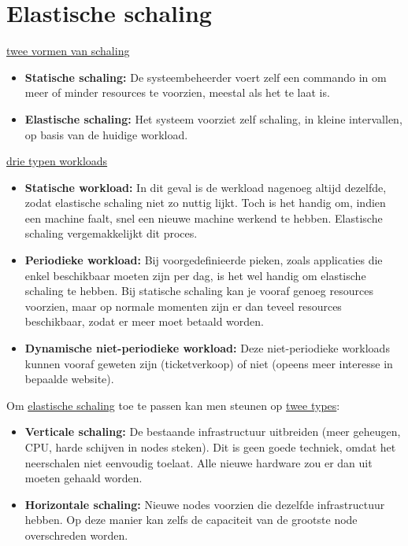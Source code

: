 	\section{Elastische schaling}
	\underline{twee vormen van schaling}
	\begin{itemize}
		\item[\info] \textbf{Statische schaling:} De systeembeheerder voert zelf een commando in om meer of minder resources te voorzien, meestal als het te laat is.
		\item[\info] \textbf{Elastische schaling:} Het systeem voorziet zelf schaling, in kleine intervallen, op basis van de huidige workload.
	\end{itemize}
	\underline{drie typen workloads}
	\begin{itemize}
		\item[\info] \textbf{Statische workload:} In dit geval is de werkload nagenoeg altijd dezelfde, zodat elastische schaling niet zo nuttig lijkt. Toch is het handig om, indien een machine faalt, snel een nieuwe machine werkend te hebben. Elastische schaling vergemakkelijkt dit proces. 
		\item[\info] \textbf{Periodieke workload:} Bij voorgedefinieerde pieken, zoals applicaties die enkel beschikbaar moeten zijn per dag, is het wel handig om elastische schaling te hebben. Bij statische schaling kan je vooraf genoeg resources voorzien, maar op normale momenten zijn er dan teveel resources beschikbaar, zodat er meer moet betaald worden.
		\item[\info] \textbf{Dynamische niet-periodieke workload:} Deze niet-periodieke workloads kunnen vooraf geweten zijn (ticketverkoop) of niet (opeens meer interesse in bepaalde website). 
	\end{itemize}

	Om \underline{elastische schaling} toe te passen kan men steunen op \underline{twee types}:
	\begin{itemize}
		\item[\alert] \textbf{Verticale schaling:} De bestaande infrastructuur uitbreiden (meer geheugen, CPU, harde schijven in nodes steken). Dit is geen goede techniek, omdat het neerschalen niet eenvoudig toelaat. Alle nieuwe hardware zou er dan uit moeten gehaald worden.
		\item[\good] \textbf{Horizontale schaling:} Nieuwe nodes voorzien die dezelfde infrastructuur hebben. Op deze manier kan zelfs de capaciteit van de grootste node overschreden worden.
	\end{itemize}